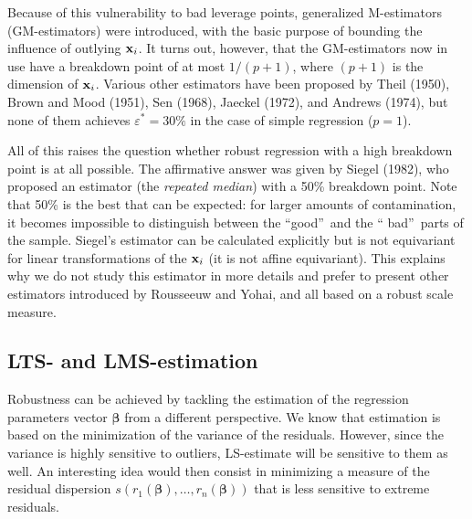Because of this vulnerability to bad leverage points, generalized M-estimators
(GM-estimators) were introduced, with the basic purpose of bounding the
influence of outlying $\mathbf x_{i}$. It turns out, however, that the
GM-estimators now in use have a breakdown point of at most $1/(p+1)$, where
$(p+1)$ is the dimension of $\mathbf x_{i}$. Various other estimators have
been proposed by Theil (1950), Brown and Mood (1951), Sen (1968), Jaeckel
(1972), and Andrews (1974), but none of them achieves $\varepsilon^{\ast
}=30\%$ in the case of simple regression ($p=1$).

All of this raises the question whether robust regression with a high
breakdown point is at all possible. The affirmative answer was given by Siegel
(1982), who proposed an estimator (the \emph{repeated median}) with a 50\%
breakdown point. Note that 50\% is the best that can be expected: for larger
amounts of contamination, it becomes impossible to distinguish between the
\textquotedblleft good\textquotedblright\ and the \textquotedblleft
bad\textquotedblright\ parts of the sample. Siegel's estimator can be
calculated explicitly but is not equivariant for linear transformations of the
$\mathbf x_{i}$ (it is not affine equivariant). This explains why we do not
study this estimator in more details and prefer to present other estimators
introduced by Rousseeuw and Yohai, and all based on a robust scale measure.

\subsection{LTS- and LMS-estimation}

Robustness can be achieved by tackling the estimation of the regression
parameters vector $\boldsymbol\beta$ from a different perspective. We know
that  estimation is based on the minimization of the variance of the
residuals. However, since the variance is highly sensitive to outliers,
LS-estimate will be sensitive to them as well. An interesting idea would then
consist in minimizing a measure of the residual dispersion $s\left(
r_{1}(\boldsymbol\beta),\ldots,r_{n}(\boldsymbol\beta)\right)  $ that is
less sensitive to extreme residuals.


